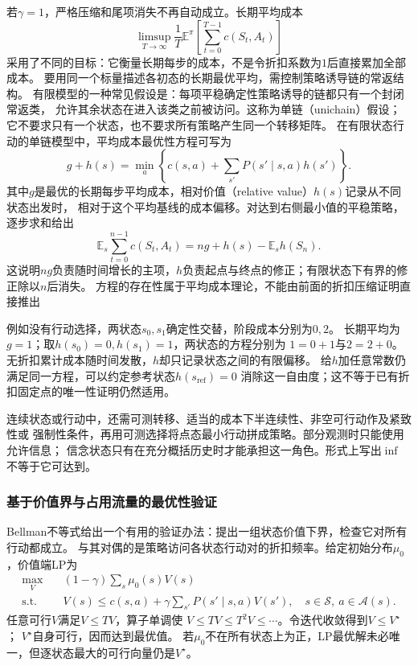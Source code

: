 若$\gamma=1$，严格压缩和尾项消失不再自动成立。长期平均成本
\[
  \limsup_{T\to\infty}\frac1T
    \mathbb E^\pi\left[\sum_{t=0}^{T-1}c(S_t,A_t)\right]
\]
采用了不同的目标：它衡量长期每步的成本，不是令折扣系数为$1$后直接累加全部成本。
要用同一个标量描述各初态的长期最优平均，需控制策略诱导链的常返结构。
有限模型的一种常见假设是：每项平稳确定性策略诱导的链都只有一个封闭常返类，
允许其余状态在进入该类之前被访问。这称为单链（unichain）假设；
它不要求只有一个状态，也不要求所有策略产生同一个转移矩阵。
在有限状态行动的单链模型中，平均成本最优性方程可写为
\[
  g+h(s)=\min_a\left\{c(s,a)+\sum_{s'}P(s'\mid s,a)h(s')\right\}.
\]
其中$g$是最优的长期每步平均成本，相对价值（relative value）$h(s)$记录从不同状态出发时，
相对于这个平均基线的成本偏移。对达到右侧最小值的平稳策略，逐步求和给出
\[
 \mathbb E_s\sum_{t=0}^{n-1}c(S_t,A_t)
 =ng+h(s)-\mathbb E_s h(S_n).
\]
这说明$ng$负责随时间增长的主项，$h$负责起点与终点的修正；有限状态下有界的修正除以$n$后消失。
方程的存在性属于平均成本理论，不能由前面的折扣压缩证明直接推出

例如没有行动选择，两状态$s_0,s_1$确定性交替，阶段成本分别为$0,2$。
长期平均为$g=1$；取$h(s_0)=0,h(s_1)=1$，两状态的方程分别为
$1=0+1$与$2=2+0$。无折扣累计成本随时间发散，$h$却只记录状态之间的有限偏移。
给$h$加任意常数仍满足同一方程，可以约定参考状态$h(s_{\mathrm{ref}})=0$
消除这一自由度；这不等于已有折扣固定点的唯一性证明仍然适用。

连续状态或行动中，还需可测转移、适当的成本下半连续性、非空可行动作及紧致性或
强制性条件，再用可测选择将点态最小行动拼成策略。部分观测时只能使用允许信息；
信念状态只有在充分概括历史时才能承担这一角色。形式上写出$\inf$不等于它可达到。

\subsubsection{基于价值界与占用流量的最优性验证}

Bellman不等式给出一个有用的验证办法：提出一组状态价值下界，检查它对所有行动都成立。
与其对偶的是策略访问各状态行动对的折扣频率。给定初始分布$\mu_0$，价值端LP为
\begin{equation}
  \begin{aligned}
    \max_V\quad &(1-\gamma)\sum_s\mu_0(s)V(s)\\
    \text{s.t.}\quad&
      V(s)\leq c(s,a)+\gamma\sum_{s'}P(s'\mid s,a)V(s'),
      \quad s\in\mathcal S,\ a\in\mathcal A(s).
  \end{aligned}
  \label{eq:decision-value-lp}
\end{equation}
任意可行$V$满足$V\leq TV$，算子单调使
$V\leq TV\leq T^2V\leq\cdots$。令迭代收敛得到$V\leq V^\star$；
$V^\star$自身可行，因而达到最优值。
若$\mu_0$不在所有状态上为正，LP最优解未必唯一，但逐状态最大的可行向量仍是$V^\star$。

